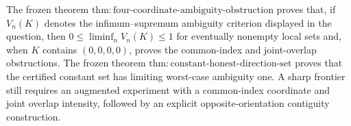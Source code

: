 The frozen theorem \(\mathrm{thm{:}four\text{-}coordinate\text{-}ambiguity\text{-}obstruction}\) proves that, if \(V_n(K)\) denotes the infimum--supremum ambiguity criterion displayed in the question, then \(0\leq\liminf_n V_n(K)\leq1\) for eventually nonempty local sets and, when \(K\) contains \((0,0,0,0)\), proves the common-index and joint-overlap obstructions. The frozen theorem \(\mathrm{thm{:}constant\text{-}honest\text{-}direction\text{-}set}\) proves that the certified constant set has limiting worst-case ambiguity one. A sharp frontier still requires an augmented experiment with a common-index coordinate and joint overlap intensity, followed by an explicit opposite-orientation contiguity construction.